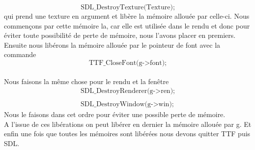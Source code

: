 \documentclass[a4paper,10p]{report}
\begin{document}
\begin{equation*}
\text{SDL\_DestroyTexture(Texture);}
\end{equation*}
qui prend une texture en argument et libère la mémoire allouée par celle-ci. Nous commençons par cette mémoire la, car elle est utilisée dans le rendu et donc pour éviter toute possibilité de perte de mémoire, nous l'avons placer en premiers.
\\Ensuite nous libérons la mémoire allouée par le pointeur de font avec la commande
\begin{equation*}
\text{TTF\_CloseFont(g->font);}
\end{equation*}
\\Nous faisons la même chose pour le rendu et la fenêtre
\begin{equation*}
\begin{split}
\text{SDL\_DestroyRenderer(g->ren);}
\\
\\
\text{SDL\_DestroyWindow(g->win);}
\end{split}
\end{equation*}
Nous le faisons dans cet ordre pour éviter une possible perte de mémoire.\\
A l'issue de ces libérations on peut libérer en dernier la mémoire allouée par g. Et enfin une fois que toutes les mémoires sont libérées nous devons quitter TTF puis SDL.
\end{document}
